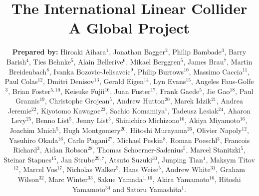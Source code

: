\documentclass[%
 reprint,
 amsmath,amssymb,
 aps,
]{revtex4-1}
\begin{document}

\title{The International Linear Collider \\ A Global Project}%

\author{\textbf{Prepared by:}
Hiroaki Aihara$^1$, Jonathan Bagger$^2$, Philip Bambade$^3$, Barry Barish$^4$,  Ties Behnke$^5$, Alain Bellerive$^6$, Mikael Berggren$^5$, James Brau$^7$, Martin Breidenbach$^8$, 
Ivanka Bozovic-Jelisavcic$^9$,
Philip Burrows$^{10}$, Massimo Caccia$^{11}$, Paul Colas$^{12}$, Dmitri Denisov$^{13}$, Gerald Eigen$^{14}$, Lyn Evans$^{15}$, Angeles Faus-Golfe$^{3}$, Brian Foster$^{5,10}$, Keisuke Fujii$^{16}$, Juan Fuster$^{17}$, Frank Gaede$^{5}$, Jie Gao$^{18}$, Paul Grannis$^{19}$, Christophe Grojean$^{5}$, Andrew Hutton$^{20}$, Marek Idzik$^{21}$, Andrea Jeremie$^{22}$, Kiyotomo Kawagoe$^{23}$, Sachio Komamiya$^{1}$, Tadeusz Lesiak$^{24}$, Aharon Levy$^{25}$, Benno List$^{5}$, Jenny List$^{5}$, Shinichiro Michizono$^{16}$, Akiya Miyamoto$^{16}$, Joachim Mnich$^{5}$, Hugh Montgomery$^{20}$, Hitoshi Murayama$^{26}$, Olivier Napoly$^{12}$, Yasuhiro Okada$^{16}$, Carlo Pagani$^{27}$, Michael Peskin$^{8}$, Roman Poeschl$^{3}$, Francois Richard$^{3}$, Aidan Robson$^{28}$, Thomas Schoerner-Sadenius$^{5}$, Marcel Stanitzki$^5$, Steinar Stapnes$^{15}$, Jan Strube$^{29,7}$, Atsuto Suzuki$^{30}$, Junping Tian$^{1}$, Maksym Titov$^{12}$, Marcel Vos$^{17}$, Nicholas Walker$^{5}$, Hans Weise$^{5}$, Andrew White$^{31}$, Graham Wilson$^{32}$, Marc Winter$^{33}$, Sakue Yamada$^{1,16}$, Akira Yamamoto$^{16}$, Hitoshi Yamamoto$^{34}$ and Satoru Yamashita$^{1}$. }
\end{document}

